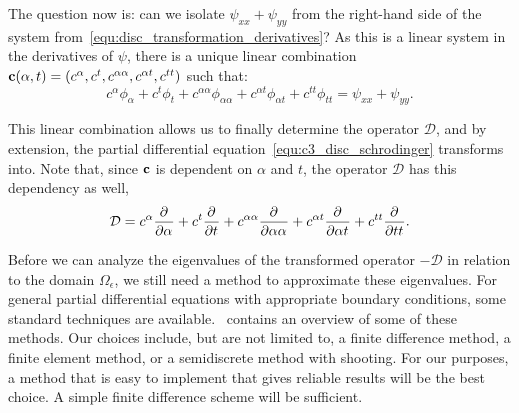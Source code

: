 The question now is: can we isolate $\psi_{xx} + \psi_{yy}$ from the right-hand side of the system from~\eqref{equ:disc_transformation_derivatives}? As this is a linear system in the derivatives of $\psi$, there is a unique linear combination $\vb{c}(\alpha, t) = (c^\alpha, c^t, c^{\alpha\alpha}, c^{\alpha t}, c^{tt})$ such that:
$$
  c^\alpha \phi_\alpha + c^t\phi_t + c^{\alpha\alpha}\phi_{\alpha\alpha} + c^{\alpha t} \phi_{\alpha t} + c^{tt} \phi_{tt} = \psi_{xx} + \psi_{yy}\text{.}
$$

This linear combination allows us to finally determine the operator $\mathcal{D}$, and by extension, the partial differential equation~\eqref{equ:c3_disc_schrodinger} transforms into. Note that, since $\vb{c}$ is dependent on $\alpha$ and $t$, the operator $\mathcal{D}$ has this dependency as well,
$$
  \mathcal{D} = c^\alpha {\pdv[]{}{\alpha}} + c^t \pdv[]{}{t} + c^{\alpha\alpha} \pdv[]{}{\alpha\alpha} + c^{\alpha t} \pdv[]{}{\alpha t} + c^{tt} \pdv[]{}{tt}\text{.}
$$

Before we can analyze the eigenvalues of the transformed operator $-\mathcal{D}$ in relation to the domain $\Omega_\epsilon$, we still need a method to approximate these eigenvalues. For general partial differential equations with appropriate boundary conditions, some standard techniques are available.~\cite[Chapter~11]{heath_scientific_2002} contains an overview of some of these methods. Our choices include, but are not limited to, a finite difference method, a finite element method, or a semidiscrete method with shooting. For our purposes, a method that is easy to implement that gives reliable results will be the best choice. A simple finite difference scheme will be sufficient.

